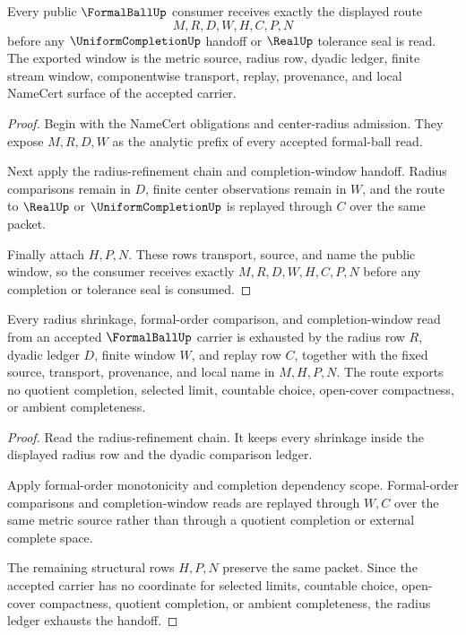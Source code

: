 \begin{theorem}
\label{thm:formalball-public-window-export}
Every public $\FormalBallUp$ consumer receives exactly the displayed route
$$
M,R,D,W,H,C,P,N
$$
before any $\UniformCompletionUp$ handoff or $\RealUp$ tolerance seal is read. The exported window is the metric source, radius row, dyadic ledger, finite stream window, componentwise transport, replay, provenance, and local NameCert surface of the accepted carrier.
\end{theorem}
\begin{proof}
Begin with the NameCert obligations and center-radius admission. They expose $M,R,D,W$ as the analytic prefix of every accepted formal-ball read.

Next apply the radius-refinement chain and completion-window handoff. Radius comparisons remain in $D$, finite center observations remain in $W$, and the route to $\RealUp$ or $\UniformCompletionUp$ is replayed through $C$ over the same packet.

Finally attach $H,P,N$. These rows transport, source, and name the public window, so the consumer receives exactly $M,R,D,W,H,C,P,N$ before any completion or tolerance seal is consumed.
\end{proof}

\begin{theorem}
\label{thm:formalball-radius-ledger-exhaustion}
Every radius shrinkage, formal-order comparison, and completion-window read from an accepted $\FormalBallUp$ carrier is exhausted by the radius row $R$, dyadic ledger $D$, finite window $W$, and replay row $C$, together with the fixed source, transport, provenance, and local name in $M,H,P,N$. The route exports no quotient completion, selected limit, countable choice, open-cover compactness, or ambient completeness.
\end{theorem}
\begin{proof}
Read the radius-refinement chain. It keeps every shrinkage inside the displayed radius row and the dyadic comparison ledger.

Apply formal-order monotonicity and completion dependency scope. Formal-order comparisons and completion-window reads are replayed through $W,C$ over the same metric source rather than through a quotient completion or external complete space.

The remaining structural rows $H,P,N$ preserve the same packet. Since the accepted carrier has no coordinate for selected limits, countable choice, open-cover compactness, quotient completion, or ambient completeness, the radius ledger exhausts the handoff.
\end{proof}

